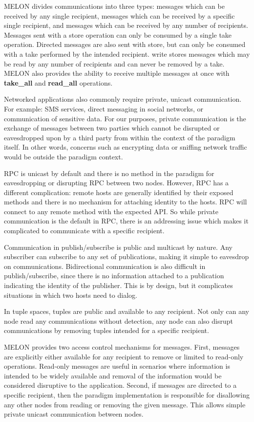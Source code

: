 \documentclass{llncs}
\begin{document}
MELON divides communications into three types: messages which can be received by any single recipient, messages which can be received by a specific single recipient, and messages which can be received by any number of recipients. Messages sent with a store operation can only be consumed by a single take operation. Directed messages are also sent with store, but can only be consumed with a take performed by the intended recipient. write stores messages which may be read by any number of recipients and can never be removed by a take. MELON also provides the ability to receive multiple messages at once with \textbf{take\_all} and \textbf{read\_all} operations.
    
Networked applications also commonly require private, unicast communication. For example: SMS services, direct messaging in social networks, or communication of sensitive data. For our purposes, private communication is the exchange of messages between two parties which cannot be disrupted or eavesdropped upon by a third party from within the context of the paradigm itself. In other words, concerns such as encrypting data or sniffing network traffic would be outside the paradigm context.

RPC is unicast by default and there is no method in the paradigm for eavesdropping or disrupting RPC between two nodes. However, RPC has a different complication: remote hosts are generally identified by their exposed methods and there is no mechanism for attaching identity to the hosts. RPC will connect to any remote method with the expected API. So while private communication is the default in RPC, there is an addressing issue which makes it complicated to communicate with a specific recipient.

Communication in publish/subscribe is public and multicast by nature. Any subscriber can subscribe to any set of publications, making it simple to eavesdrop on communications. Bidirectional communication is also difficult in publish/subscribe, since there is no information attached to a publication indicating the identity of the publisher. This is by design, but it complicates situations in which two hosts need to dialog.

In tuple spaces, tuples are public and available to any recipient. Not only can any node read any communications without detection, any node can also disrupt communications by removing tuples intended for a specific recipient.

MELON provides two access control mechanisms for messages. First, messages are explicitly either available for any recipient to remove or limited to read-only operations. Read-only messages are useful in scenarios where information is intended to be widely available and removal of the information would be considered disruptive to the application. Second, if messages are directed to a specific recipient, then the paradigm implementation is responsible for disallowing any other nodes from reading or removing the given message. This allows simple private unicast communication between nodes.
\end{document}
